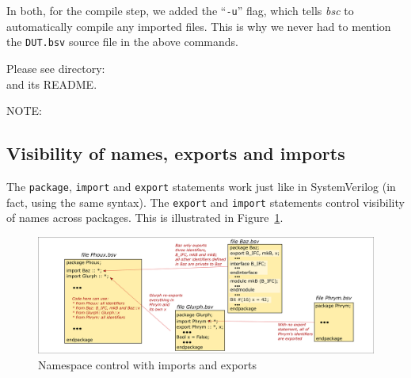 In both, for the compile step, we added the ``\verb|-u|'' flag, which
tells \emph{bsc} to automatically compile any imported files.  This is
why we never had to mention the \verb|DUT.bsv| source file in the
above commands.

\Beginexercise

Please see directory:  \\
and its README.
\Endexercise

\vspace{2ex}

NOTE:


\subsection{Visibility of names, exports and imports}

The \verb|package|, \verb|import| and \verb|export| statements work
just like in SystemVerilog (in fact, using the same syntax).  The
\verb|export| and \verb|import| statements control visibility of names
across packages.  This is illustrated in Figure~\ref{Fig_BSV_namespace_control}.
\begin{figure}[htbp]
  \centerline{\includegraphics[width=6in,angle=0]{Figures/Fig_BSV_namespace_control}}
  \caption{\label{Fig_BSV_namespace_control}
           Namespace control with imports and exports}
\end{figure}

